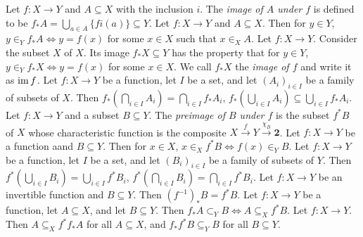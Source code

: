  Let $f \colon X \to Y$ and $A \subseteq X$ with the inclusion $i$. The \textit{image of $A$ under $f$} is defined to be $f_*A = \bigcup_{a \in A} \{ fi(a) \} \subseteq Y$.
 Let $f \colon X \to Y$ and $A \subseteq X$. Then for $y \in Y$, $y \in_Y f_*A \iff y = f(x)$ for some $x \in X$ such that $x \in_X A$.
 Let $f \colon X \to Y$. Consider the subset $X$ of $X$. Its image $f_*X \subseteq Y$ has the property that for $y \in Y$, $y \in_Y f_*X \iff y = f(x)$ for some $x \in X$. We call $f_*X$ the \textit{image of $f$} and write it as $\operatorname{im} f$.
 Let $f \colon X \to Y$ be a function, let $I$ be a set, and let $(A_i)_{i \in I}$ be a family of subsets of $X$. Then $f_*(\bigcap_{i \in I} A_i) = \bigcap_{i \in I} f_* A_i$, $f_*(\bigcup_{i \in I} A_i) \subseteq \bigcup_{i \in I} f_* A_i$.
 Let $f \colon X \to Y$ and a subset $B \subseteq Y$. The \textit{preimage of $B$ under $f$} is the subset $f^*B$ of $X$ whose characteristic function is the composite $X \xrightarrow{f} Y \xrightarrow{\chi_B} \mathbf{2}$.
 Let $f \colon X \to Y$ be a function aand $B \subseteq Y$. Then for $x \in X$, $x \in_X f^*B \iff f(x) \in_Y B$.
 Let $f \colon X \to Y$ be a function, let $I$ be a set, and let $(B_i)_{i \in I}$ be a family of subsets of $Y$. Then $f^*(\bigcup_{i \in I} B_i) = \bigcup_{i \in I} f^* B_i$, $f^*(\bigcap_{i \in I} B_i) = \bigcap_{i \in I} f^* B_i$.
 Let $f \colon X \to Y$ be an invertible function and $B \subseteq Y$. Then $(f^{-1})_*B = f^*B$.
 Let $f \colon X \to Y$ be a function, let $A \subseteq X$, and let $B \subseteq Y$. Then $f_*A \subset_Y B \iff A \subseteq_X f^*B$.
 Let $f: X \to Y$. Then $A \subseteq_X f^*f_*A$ for all $A \subseteq X$, and $f_*f^*B \subseteq_Y B$ for all $B \subseteq Y$.
